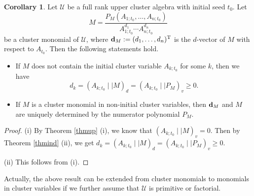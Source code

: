 \documentclass{amsart}
\theoremstyle{definition}
\newtheorem{corollary}[theorem]{Corollary}
\theoremstyle{remark}
\numberwithin{equation}{section}
\begin{document}
\begin{corollary}\label{cordvec}
 Let $\mathcal U$ be a full rank upper cluster algebra with initial seed $t_0$. Let
 $$M=\frac{P_M(A_{1;t_0},\ldots,A_{n;t_0})}{A_{1;t_0}^{d_1}\cdots A_{n;t_0}^{d_n}}$$ be a cluster monomial of $\mathcal U$,  where ${\bf d}_M:=(d_1,\ldots,d_n)^{\rm T}$ is the $d$-vector of $M$ with respect to $A_{t_0}$. Then the following statements hold.
 \begin{itemize}
 \item[(i)]  If $M$ does not contain the initial cluster variable $A_{k;t_0}$ for some $k$, then we have
 $$d_k=(A_{k;t_0}\mid\mid M)_d=(A_{k;t_0}\mid\mid P_M)_v\geq 0.$$

 \item[(ii)] If $M$ is a cluster monomial in non-initial cluster variables, then ${\bf d}_M$ and $M$ are uniquely determined by the numerator polynomial $P_M$.
 \end{itemize}
\end{corollary}
\begin{proof}
(i) By Theorem \ref{thmup} (i), we know that $(A_{k;t_0}\mid\mid M)_v=0$. Then by Theorem \ref{thmind} (ii), we get $d_k=(A_{k;t_0}\mid\mid M)_d=(A_{k;t_0}\mid\mid P_M)_v\geq 0$.

(ii) This follows from (i).
\end{proof}

Actually, the above result can be extended from  cluster monomials to monomials in cluster variables if we further assume that $\mathcal U$ is primitive or factorial.
\end{document}
